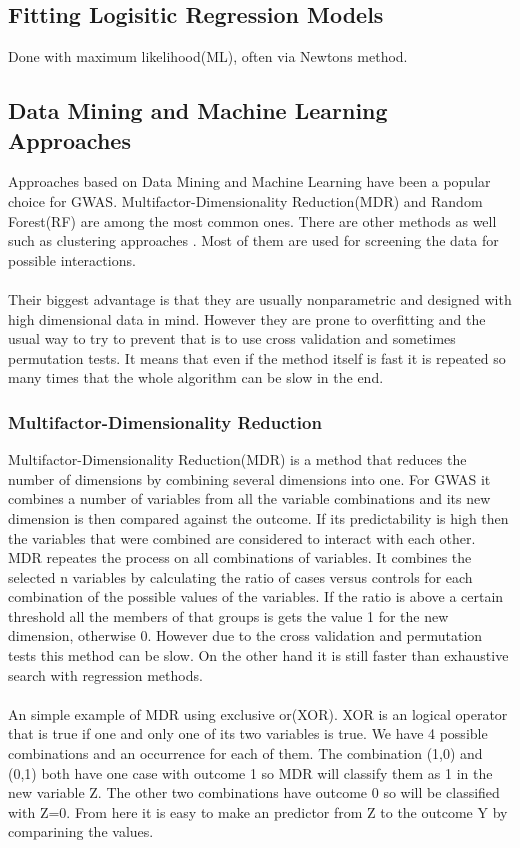 \documentclass[10pt,a4paper]{report}
\begin{document}
\subsection{Fitting Logisitic Regression Models}
Done with maximum likelihood(ML), often via Newtons method.

\subsection{Data Mining and Machine Learning Approaches}
\label{data_machine_learning}
Approaches based on Data Mining and Machine Learning have been a popular choice for GWAS. Multifactor-Dimensionality Reduction(MDR)\cite{mdr_2001} and Random Forest(RF)\cite{random_forest} are among the most common ones\cite{gene_enviroment_2013,cordell_detect_review}. There are other methods as well such as clustering approaches \cite{fast_high_order_cluster}. Most of them are used for screening the data for possible interactions\cite{gene_enviroment_2013,cordell_detect_review}.\\
\\
Their biggest advantage is that they are usually nonparametric and designed with high dimensional data in mind. However they are prone to overfitting and the usual way to try to prevent that is to use cross validation and sometimes permutation tests. It means that even if the method itself is fast it is repeated so many times that the whole algorithm can be slow in the end.\cite{cordell_detect_review}

\subsubsection{Multifactor-Dimensionality Reduction}
Multifactor-Dimensionality Reduction(MDR) is a method that reduces the number of dimensions by combining several dimensions into one. For GWAS it combines a number of variables from all the variable combinations and its new dimension is then compared against the outcome. If its predictability is high then the variables that were combined are considered to interact with each other. MDR repeates the process on all combinations of variables. It combines the selected n variables by calculating the ratio of cases versus controls for each combination of the possible values of the variables. If the ratio is above a certain threshold all the members of that groups is gets the value 1 for the new dimension, otherwise 0. However due to the cross validation and permutation tests this method can be slow. On the other hand it is still faster than exhaustive search with regression methods.\cite{cordell_detect_review,mdr_2001}\\
\\
An simple example of MDR using exclusive or(XOR). XOR is an logical operator that is true if one and only one of its two variables is true. We have 4 possible combinations and an occurrence for each of them. The combination (1,0) and (0,1) both have one case with outcome 1 so MDR will classify them as 1 in the new variable Z. The other two combinations have outcome 0 so will be classified with Z=0. From here it is easy to make an predictor from Z to the outcome Y by comparining the values.
\end{document}
